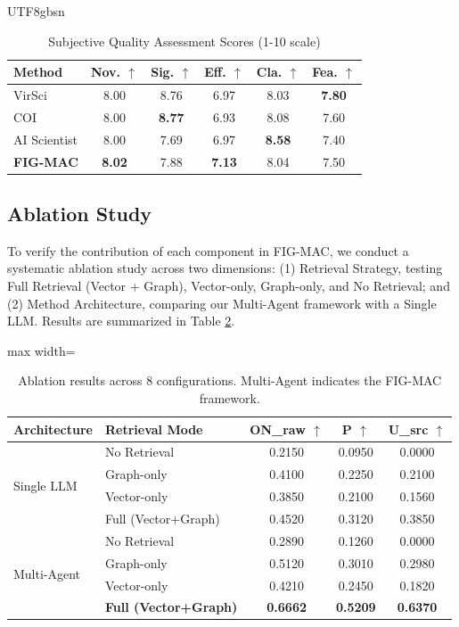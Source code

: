 \documentclass[11pt]{article}
\begin{document}
\begin{CJK}{UTF8}{gbsn}
\begin{table}[H]
\centering
\small
\setlength{\tabcolsep}{5pt}
\begin{tabular}{lccccc}
\toprule
\textbf{Method} & \textbf{Nov.} $\uparrow$ & \textbf{Sig.} $\uparrow$ & \textbf{Eff.} $\uparrow$ & \textbf{Cla.} $\uparrow$ & \textbf{Fea.} $\uparrow$ \\
\midrule
VirSci & 8.00 & 8.76 & 6.97 & 8.03 & \textbf{7.80} \\
COI & 8.00 & \textbf{8.77} & 6.93 & 8.08 & 7.60 \\
AI Scientist & 8.00 & 7.69 & 6.97 & \textbf{8.58} & 7.40 \\
\midrule
\textbf{FIG-MAC} & \textbf{8.02} & 7.88 & \textbf{7.13} & 8.04 & 7.50 \\
\bottomrule
\end{tabular}
\caption{Subjective Quality Assessment Scores (1-10 scale)}
\label{tab:subjective_quality}
\end{table}

\subsection{Ablation Study}
\label{sec:ablation}
To verify the contribution of each component in FIG-MAC, we conduct a systematic ablation study across two dimensions: (1) Retrieval Strategy, testing Full Retrieval (Vector + Graph), Vector-only, Graph-only, and No Retrieval; and (2) Method Architecture, comparing our Multi-Agent framework with a Single LLM. Results are summarized in Table \ref{tab:ablation_results}.

\begin{table}[H]
\centering
\small
\begin{adjustbox}{max width=\columnwidth}
\begin{tabular}{llccc}
\toprule
\textbf{Architecture} & \textbf{Retrieval Mode} & \textbf{ON\_raw} $\uparrow$ & \textbf{P} $\uparrow$ & \textbf{U\_src} $\uparrow$ \\
\midrule
\multirow{4}{*}{Single LLM} & No Retrieval & 0.2150 & 0.0950 & 0.0000 \\
 & Graph-only & 0.4100 & 0.2250 & 0.2100 \\
 & Vector-only & 0.3850 & 0.2100 & 0.1560 \\
 & Full (Vector+Graph) & 0.4520 & 0.3120 & 0.3850 \\
\midrule
\multirow{4}{*}{Multi-Agent} & No Retrieval & 0.2890 & 0.1260 & 0.0000 \\
 & Graph-only & 0.5120 & 0.3010 & 0.2980 \\
 & Vector-only & 0.4210 & 0.2450 & 0.1820 \\
 & \textbf{Full (Vector+Graph)} & \textbf{0.6662} & \textbf{0.5209} & \textbf{0.6370} \\
\bottomrule
\end{tabular}
\end{adjustbox}
\caption{Ablation results across 8 configurations. Multi-Agent indicates the FIG-MAC framework.}
\label{tab:ablation_results}
\end{table}


\end{CJK}
\end{document}
